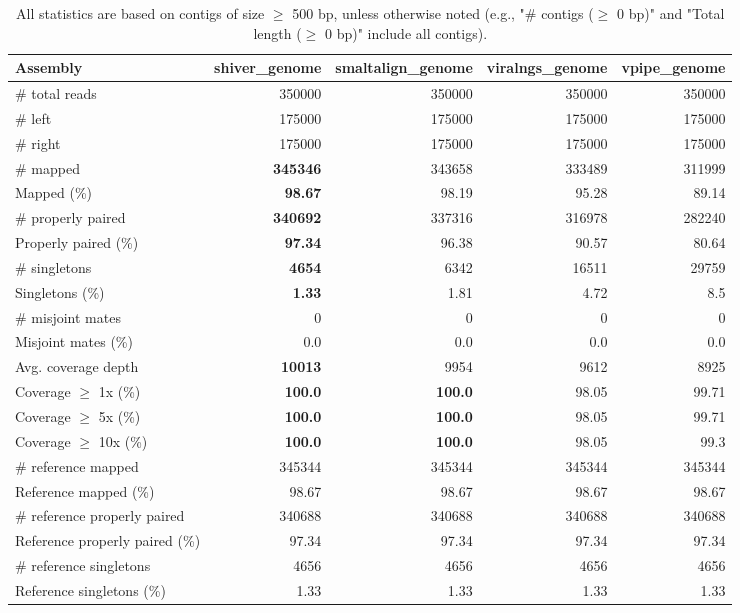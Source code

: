 \documentclass[12pt,a4paper]{article}
\begin{document}
\begin{table}[ht]
\begin{center}
\caption{All statistics are based on contigs of size $\geq$ 500 bp, unless otherwise noted (e.g., "\# contigs ($\geq$ 0 bp)" and "Total length ($\geq$ 0 bp)" include all contigs).}
\begin{tabular}{|l*{4}{|r}|}
\hline
Assembly & shiver\_genome & smaltalign\_genome & viralngs\_genome & vpipe\_genome \\ \hline
\# total reads & 350000 & 350000 & 350000 & 350000 \\ \hline
\# left & 175000 & 175000 & 175000 & 175000 \\ \hline
\# right & 175000 & 175000 & 175000 & 175000 \\ \hline
\# mapped & {\bf 345346} & 343658 & 333489 & 311999 \\ \hline
Mapped (\%) & {\bf 98.67} & 98.19 & 95.28 & 89.14 \\ \hline
\# properly paired & {\bf 340692} & 337316 & 316978 & 282240 \\ \hline
Properly paired (\%) & {\bf 97.34} & 96.38 & 90.57 & 80.64 \\ \hline
\# singletons & {\bf 4654} & 6342 & 16511 & 29759 \\ \hline
Singletons (\%) & {\bf 1.33} & 1.81 & 4.72 & 8.5 \\ \hline
\# misjoint mates & 0 & 0 & 0 & 0 \\ \hline
Misjoint mates (\%) & 0.0 & 0.0 & 0.0 & 0.0 \\ \hline
Avg. coverage depth & {\bf 10013} & 9954 & 9612 & 8925 \\ \hline
Coverage $\geq$ 1x (\%) & {\bf 100.0} & {\bf 100.0} & 98.05 & 99.71 \\ \hline
Coverage $\geq$ 5x (\%) & {\bf 100.0} & {\bf 100.0} & 98.05 & 99.71 \\ \hline
Coverage $\geq$ 10x (\%) & {\bf 100.0} & {\bf 100.0} & 98.05 & 99.3 \\ \hline
\# reference mapped & 345344 & 345344 & 345344 & 345344 \\ \hline
Reference mapped (\%) & 98.67 & 98.67 & 98.67 & 98.67 \\ \hline
\# reference properly paired & 340688 & 340688 & 340688 & 340688 \\ \hline
Reference properly paired (\%) & 97.34 & 97.34 & 97.34 & 97.34 \\ \hline
\# reference singletons & 4656 & 4656 & 4656 & 4656 \\ \hline
Reference singletons (\%) & 1.33 & 1.33 & 1.33 & 1.33 \\ \hline

\end{tabular}
\end{center}
\end{table}
\end{document}
